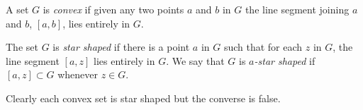 A set $G$ is \textit{convex} if given any two points $a$ and $b$ in $G$ the line segment joining $a$ and $b$, $[a, b]$, lies entirely in $G$.

The set $G$ is \textit{star shaped} if there is a point $a$ in $G$ such that for each $z$ in $G$, the line segment $[a, z]$ lies entirely in $G$. We say that $G$ is \textit{$a$-star shaped} if $[a, z] \subset G$ whenever $z \in G$.

Clearly each convex set is star shaped but the converse is false.
